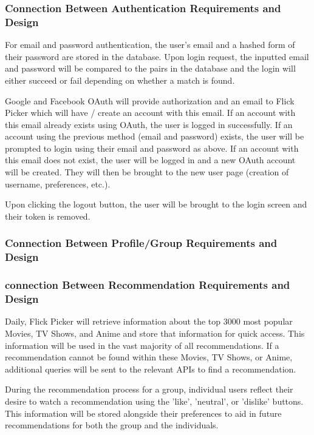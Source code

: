 \documentclass[12pt, titlepage]{article}
\begin{document}
\subsubsection{Connection Between Authentication Requirements and Design}
\hspace*{14pt} For email and password authentication, the user's email and a hashed form of their password are stored in the database. Upon login request, the inputted email and password will be compared to the pairs in the database and the login will either succeed or fail depending on whether a match is found. 

Google and Facebook OAuth will provide authorization and an email to Flick Picker which will have / create an account with this email. If an account with this email already exists using OAuth, the user is logged in successfully. If an account using the previous method (email and password) exists, the user will be prompted to login using their email and password as above. If an account with this email does not exist, the user will be logged in and a new OAuth account will be created. They will then be brought to the new user page (creation of username, preferences, etc.). 

Upon clicking the logout button, the user will be brought to the login screen and their token is removed.

\subsubsection{Connection Between Profile/Group Requirements and Design}


\subsubsection{connection Between Recommendation Requirements and Design}
\hspace*{14pt} Daily, Flick Picker will retrieve information about the top 3000 most popular Movies, TV Shows, and Anime and store that information for quick access. This information will be used in the vast majority of all recommendations. If a recommendation cannot be found within these Movies, TV Shows, or Anime, additional queries will be sent to the relevant APIs to find a recommendation.

During the recommendation process for a group, individual users reflect their desire to watch a recommendation using the 'like', 'neutral', or 'dislike' buttons. This information will be stored alongside their preferences to aid in future recommendations for both the group and the individuals. 
\end{document}
